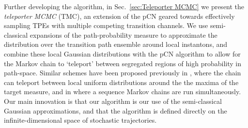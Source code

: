 Further developing the algorithm, in Sec.~\ref{sec:Teleporter MCMC} we present the \textit{teleporter MCMC} (TMC), an extension of the pCN geared towards effectively sampling TPEs with multiple competing transition channels. We use semi-classical expansions \citep{chaichianPathIntegralsPhysics2001, schulmanTechniquesApplicationsPath1996, smirnovEstimationPathIntegral2010, moretteDefinitionApproximationFeynman1951, marinovPathIntegralsQuantum1980, sakuraiModernQuantumMechanics2017} of the path-probability measure to approximate the distribution over the transition path ensemble around local instantons, and combine these local Gaussian distributions with the pCN algorithm to allow for the Markov chain to `teleport' between segregated regions of high probability in path-space. Similar schemes have been proposed previously in \citep{sminchisescuModeHoppingMCMCSamplera}, where the chain can teleport between local uniform distributions around the the maxima of the target measure, and in \citep{lindseyEnsembleMarkovChain2021} where a sequence Markov chains are run simultaneously. Our main innovation is that our algorithm is our use of the semi-classical Gaussian approximations, and that the algorithm is defined directly on the infinite-dimensional space of stochastic trajectories.

